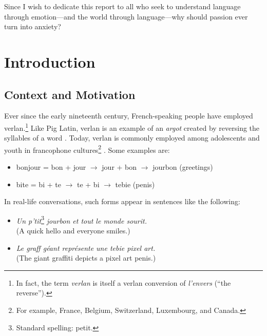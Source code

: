\documentclass[12pt]{article}
\newif\ifskipsectionclear
\begin{document}
Since I wish to dedicate this report to all who seek to understand language through emotion\;---\;and the world through language\;---\;why should passion ever turn into anxiety?

\cleardoublepage
\skipsectioncleartrue
{}
\setcounter{page}{1}
\section{Introduction}
\subsection{Context and Motivation}

Ever since the early nineteenth century, French-speaking people have employed verlan.\footnote{In fact, the term \textit{verlan} is itself a verlan conversion of \textit{l'envers} (``the reverse'').} 
Like Pig Latin, verlan is an example of an \textit{argot} created by reversing the syllables of a word \cite{rajabov2025,bach2018}. Today, verlan is commonly employed among adolescents and youth in francophone cultures\footnote{For example, France, Belgium, Switzerland, Luxembourg, and Canada.} \cite{evolutionverlan}. Some examples are:

\begin{flushleft}
\small
\begin{itemize}
  \item bonjour = bon + jour \(\rightarrow\) jour + bon \(\rightarrow\) jourbon (greetings)
  \item bite = bi + te \(\rightarrow\) te + bi \(\rightarrow\) tebie (penis)
\end{itemize}
\end{flushleft}

\noindent In real-life conversations, such forms appear in sentences like the following:

\begin{flushleft}
\small
\begin{itemize}
  \item \textit{Un p'tit}\footnote{Standard spelling: petit.}\textit{ jourbon et tout le monde sourit.}\\(A quick hello and everyone smiles.)
  \item \textit{Le graff géant représente une tebie pixel art.}\\(The giant graffiti depicts a pixel art penis.)
\end{itemize}
\end{flushleft}
\end{document}

